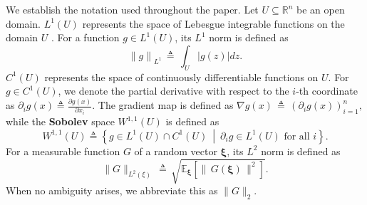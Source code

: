 \documentclass[11pt,reqno]{amsart}
\newcommand{\pl}{\partial}
\newcommand{\1}{{\bf 1}}
\newcommand{\2}{{\bf 2}}
\newcommand{\bxi}{\boldsymbol{\xi}}
\newcommand{\E}{\mathbb E}
\numberwithin{equation}{section}
\theoremstyle{remark}
\begin{document}
		 We establish the notation used throughout the paper. Let $U \subseteq \mathbb{R}^n$ be an open domain.
		\textbf{$L^1(U)$} {represents the} space of Lebesgue integrable functions on the domain $U$ . For a function $g \in L^1(U)$, its $L^1$ norm is defined as
		$$ {\|g\|}_{L^1} \, \triangleq\,  \int_U |g(z)| dz.$$
		\textbf{$C^1(U)$} represents the space of continuously differentiable functions on $U$. For $g \in C^1(U)$, we denote the partial derivative with respect to the $i$-th coordinate as
		$ \pl_i g(x) \triangleq \tfrac{\pl g (x)}{\pl x_i}. $
		The gradient map is defined as
		$ \nabla g(x)\, \triangleq \, \left( \pl_i g(x) \right)_{i=1}^n,$ while  the \textbf{Sobolev} space $W^{1,1}(U)$  {is defined as}
		$$ W^{1,1}(U) \triangleq \left\{ g \in L^1(U) \cap C^1(U) \ \middle| \ \pl_i g \in L^1(U) \text{ for all } i \right\}. $$
		For a measurable function $G$ of a random vector $\bxi$, its $L^2$ norm is defined as 
		$$ \|G\|_{L^2(\xi)} \, \triangleq \, \sqrt{\E_{\bxi} [ \|\, G(\bxi)\, \|^2 ]} .$$ 
		When no ambiguity arises, we abbreviate this as $\|G\|_2$.
		
		
		
		
\end{document}
